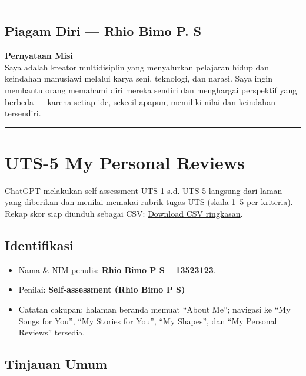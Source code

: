 \documentclass[
  letterpaper,
  DIV=11,
  numbers=noendperiod]{scrreprt}
\providecommand{\tightlist}{%
  \setlength{\itemsep}{0pt}\setlength{\parskip}{0pt}}
\begin{document}
\begin{center}\rule{0.5\linewidth}{0.5pt}\end{center}

\section{Piagam Diri --- Rhio Bimo P.
S}\label{piagam-diri-rhio-bimo-p.-s}

\textbf{Pernyataan Misi}\\
Saya adalah kreator multidisiplin yang menyalurkan pelajaran hidup dan
keindahan manusiawi melalui karya seni, teknologi, dan narasi. Saya
ingin membantu orang memahami diri mereka sendiri dan menghargai
perspektif yang berbeda --- karena setiap ide, sekecil apapun, memiliki
nilai dan keindahan tersendiri.

\begin{center}\rule{0.5\linewidth}{0.5pt}\end{center}


\chapter{UTS-5 My Personal Reviews}\label{uts-5-my-personal-reviews}

ChatGPT melakukan self-assessment UTS-1 s.d. UTS-5 langsung dari laman
yang diberikan dan menilai memakai rubrik tugas UTS (skala 1--5 per
kriteria). Rekap skor siap diunduh sebagai CSV:
\href{./Self-Assessment_UTS-1_s_d__UTS-5.csv}{Download CSV ringkasan}.

\section{Identifikasi}\label{identifikasi}

\begin{itemize}
\tightlist
\item
  Nama \& NIM penulis: \textbf{Rhio Bimo P S -- 13523123}.
\item
  Penilai: \textbf{Self-assessment (Rhio Bimo P S)}
\item
  Catatan cakupan: halaman beranda memuat ``About Me''; navigasi ke ``My
  Songs for You'', ``My Stories for You'', ``My Shapes'', dan ``My
  Personal Reviews'' tersedia.
\end{itemize}

\section{Tinjauan Umum}\label{tinjauan-umum}
\end{document}
